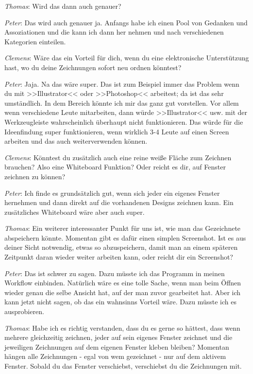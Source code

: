 \medskip \emph{Thomas}: Wird das dann auch genauer?

\medskip \emph{Peter}: Das wird auch genauer ja. Anfangs habe ich einen Pool von Gedanken und Assoziationen und die kann ich dann her nehmen und nach verschiedenen Kategorien einteilen.

\medskip \emph{Clemens}: Wäre das ein Vorteil für dich, wenn du eine elektronische Unterstützung hast, wo du deine Zeichnungen sofort neu ordnen könntest?

\medskip \emph{Peter}: Jaja. Na das wäre super. Das ist zum Beispiel immer das Problem wenn du mit >>Illustrator<< oder >>Photoshop<< arbeitest; da ist das sehr umständlich. In dem Bereich könnte ich mir das ganz gut vorstellen. Vor allem wenn verschiedene Leute mitarbeiten, dann würde >>Illustrator<< usw. mit der Werkzeugleiste wahrscheinlich überhaupt nicht funktionieren. Das würde für die Ideenfindung super funktionieren, wenn wirklich 3-4 Leute auf einen Screen arbeiten und das auch weiterverwenden können.

\medskip \emph{Clemens}: Könntest du zusätzlich auch eine reine weiße Fläche zum Zeichnen brauchen? Also eine Whiteboard Funktion? Oder reicht es dir, auf Fenster zeichnen zu können?

\medskip \emph{Peter}: Ich finde es grundsätzlich gut, wenn sich jeder ein eigenes Fenster hernehmen und dann direkt auf die vorhandenen Designs zeichnen kann. Ein zusätzliches Whiteboard wäre aber auch super.

\medskip \emph{Thomas}: Ein weiterer interessanter Punkt für uns ist, wie man das Gezeichnete abspeichern könnte. Momentan gibt es dafür einen simplen Screenshot. Ist es aus deiner Sicht notwendig, etwas so abzuspeichern, damit man an einem späteren Zeitpunkt daran wieder weiter arbeiten kann, oder reicht dir ein Screenshot?

\medskip \emph{Peter}: Das ist schwer zu sagen. Dazu müsste ich das Programm in meinen Workflow einbinden. Natürlich wäre es eine tolle Sache, wenn man beim Öffnen wieder genau die selbe Ansicht hat, auf der man zuvor gearbeitet hat. Aber ich kann jetzt nicht sagen, ob das ein wahnsinns Vorteil wäre. Dazu müsste ich es ausprobieren.

\medskip \emph{Thomas}: Habe ich es richtig verstanden, dass du es gerne so hättest, dass wenn mehrere gleichzeitig zeichnen, jeder auf sein eigenes Fenster zeichnet und die jeweiligen Zeichnungen auf dem eigenen Fenster kleben bleiben? Momentan hängen alle Zeichnungen - egal von wem gezeichnet - nur auf dem aktivem Fenster. Sobald du das Fenster verschiebst, verschiebst du die Zeichnungen mit.

